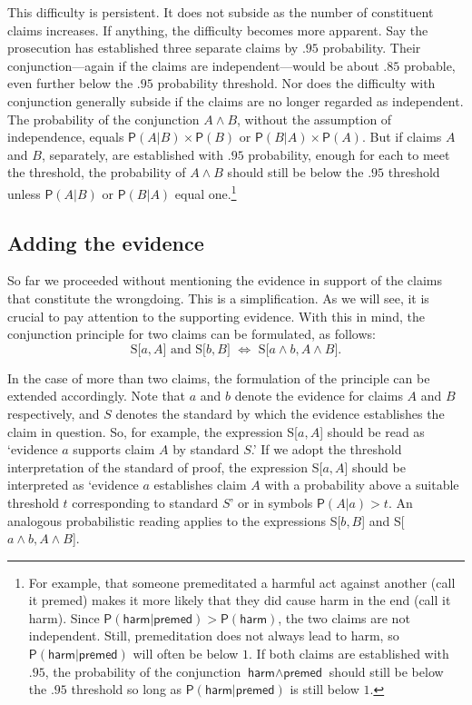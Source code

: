 \documentclass[
  10pt,
  dvipsnames,enabledeprecatedfontcommands]{scrartcl}
\newcommand{\et}{\wedge}
\newcommand{\pr}[1]{\ensuremath{\mathsf{P}(#1)}}
\begin{document}
This difficulty is persistent. It does not subside as the number of
constituent claims increases. If anything, the difficulty becomes more
apparent. Say the prosecution has established three separate claims by
\(.95\) probability. Their conjunction---again if the claims are
independent---would be about \(.85\) probable, even further below the
\(.95\) probability threshold. Nor does the difficulty with conjunction
generally subside if the claims are no longer regarded as independent.
The probability of the conjunction \(A \et B\), without the assumption
of independence, equals \(\pr{A \vert B} \times \pr{B}\) or
\(\pr{B \vert A} \times \pr{A}\). But if claims \(A\) and \(B\),
separately, are established with \(.95\) probability, enough for each to
meet the threshold, the probability of \(A \et B\) should still be below
the \(.95\) threshold unless \(\pr{A \vert B}\) or \(\pr{B \vert A}\)
equal one.\footnote{For example, that someone premeditated a harmful act
  against another (call it \textsf{premed}) makes it more likely that
  they did cause harm in the end (call it \textsf{harm}). Since
  \(\pr{\textsf{harm} \vert \textsf{premed}} > \pr{\textsf{harm}}\), the
  two claims are not independent. Still, premeditation does not always
  lead to harm, so \(\pr{\textsf{harm} \vert \textsf{premed}}\) will
  often be below \(1\). If both claims are established with \(.95\), the
  probability of the conjunction \(\textsf{harm} \et \textsf{premed}\)
  should still be below the \(.95\) threshold so long as
  \(\pr{\textsf{harm} \vert \textsf{premed}}\) is still below \(1\).}

\hypertarget{adding-the-evidence}{%
\subsection{Adding the evidence}\label{adding-the-evidence}}

So far we proceeded without mentioning the evidence in support of the
claims that constitute the wrongdoing. This is a simplification. As we
will see, it is crucial to pay attention to the supporting evidence.
With this in mind, the conjunction principle for two claims can be
formulated, as follows:
\[\text{S[$a, A$] and S[$b, B$] $\Leftrightarrow$ S[$a \wedge b, A\wedge B$]}.\]

\noindent In the case of more than two claims, the formulation of the
principle can be extended accordingly. Note that \(a\) and \(b\) denote
the evidence for claims \(A\) and \(B\) respectively, and \(S\) denotes
the standard by which the evidence establishes the claim in question.
So, for example, the expression S{[}\(a, A\){]} should be read as
`evidence \(a\) supports claim \(A\) by standard \(S\).' If we adopt the
threshold interpretation of the standard of proof, the expression
S{[}\(a, A\){]} should be interpreted as `evidence \(a\) establishes
claim \(A\) with a probability above a suitable threshold \(t\)
corresponding to standard \(S\)' or in symbols \(\pr{A \vert a}>t\). An
analogous probabilistic reading applies to the expressions
S{[}\(b, B\){]} and S{[}\(a \wedge b, A\wedge B\){]}.
\end{document}
